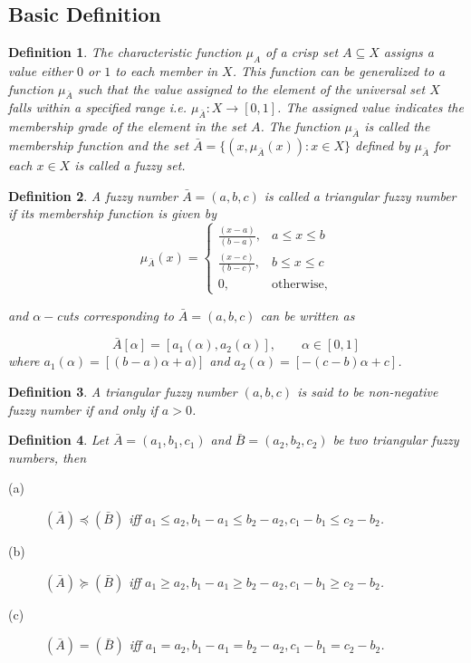 \documentclass{iaesarticle3}
\newtheorem{definition}{Definition}
\begin{document}
\subsection{Basic Definition}
\begin{definition}
    \emph{\cite{kau}} The characteristic function $\mu_{A}$ of a crisp set $A \subseteq X$ assigns a value either $0$ or $1$ to each member in $X$. This function can be generalized to a function $\mu_{\bar{A}}$ such that the value assigned to the element of the universal set $X$ falls within a specified range i.e. $\mu_{\bar{A}}\colon X \to [0,1]$. The assigned value indicates the membership grade of the element in the set $A$. The function $\mu_{\bar{A}}$ is called the membership function and the set $\bar{A} = \{(x, \mu_{\bar{A}}(x))\colon x \in X \}$ defined by $\mu_{\bar{A}}$ for each $x \in X$ is called a fuzzy set.
\end{definition}
\begin{definition}
    \emph{\cite{lio}} A fuzzy number $\bar{A} = (a,b,c)$ is called a triangular fuzzy number if its membership function is given by
    \begin{displaymath}
        \mu_{\bar{A}}(x) =
        \left \{ \begin{array}{ll}
            \frac{(x-a)}{(b-a)},& a\leq x\leq b \\
            \frac{(x-c)}{(b-c)}, & b\leq x \leq c\\
            0, & \textrm{otherwise},
        \end{array} \right.
    \end{displaymath}
    
    \noindent and $\alpha-$cuts corresponding to $\bar{A} = (a, b, c)$ can be written as
   
    \begin{displaymath}
        \bar{A}[\alpha] = [a_1(\alpha), a_2(\alpha)], \qquad \alpha \in [0,1]
    \end{displaymath} where $a_1(\alpha) = [(b-a)\alpha +a)]$ and $a_2(\alpha) = [-(c-b)\alpha+ c]$.
\end{definition}

\begin{definition}
    \emph{\cite{lio}} A triangular fuzzy number $(a, b, c)$ is said to be non-negative fuzzy number if and only if $a > 0$.
\end{definition}

\begin{definition}
    Let $\bar{A} = (a_1, b_1, c_1)$ and $\bar{B} = (a_2, b_2, c_2)$ be two triangular fuzzy numbers, then
    \begin{description}
        \item[(a)] $(\bar{A}) \preceq (\bar{B})$ iff $a_1 \leq a_2, b_1 - a_1 \leq b_2 - a_2, c_1 - b_1 \leq c_2 - b_2$.
        \item[(b)] $(\bar{A}) \succeq (\bar{B})$ iff $a_1 \geq a_2, b_1 - a_1 \geq b_2 - a_2, c_1 - b_1 \geq c_2 - b_2$.
        \item[(c)] $(\bar{A}) = (\bar{B})$ iff $a_1 = a_2, b_1 - a_1 = b_2 - a_2, c_1 - b_1 = c_2 - b_2$.
    \end{description}
\end{definition}
\end{document}
